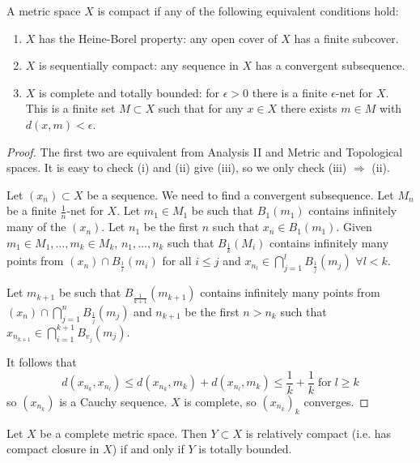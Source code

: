 \documentclass{article}
\begin{document}
\begin{prop}
    A metric space $X$ is compact if any of the following equivalent conditions hold:
    \begin{enumerate}[label=(\roman*)]
        \item $X$ has the Heine-Borel property: any open cover of $X$ has a finite subcover.
        \item $X$ is sequentially compact: any sequence in $X$ has a convergent subsequence.
        \item $X$ is complete and totally bounded: for $\epsilon > 0$ there is a finite $\epsilon$-net for $X$.
            This is a finite set $M \subset X$ such that for any $x \in X$ there exists $m \in M$ with $d(x, m) < \epsilon$.
    \end{enumerate}
\end{prop}


\begin{proof}
    The first two are equivalent from Analysis II and Metric and Topological spaces. It is easy to check (i) and (ii) give (iii), so we only check (iii) $\Rightarrow$ (ii).

    Let $(x_n) \subset X$ be a sequence. We need to find a convergent subsequence. Let $M_n$ be a finite $\frac{1}{n}$-net for $X$.
    Let $m_1 \in M_1$ be such that $B_1(m_1)$ contains infinitely many of the $(x_n)$. Let $n_1$ be the first $n$ such that $x_n \in B_1(m_1)$.
    Given $m_1 \in M_1, \dotsc, m_k \in M_k$, $n_1, \dotsc, n_k$ such that $B_\frac{1}{k}(M_i)$ contains infinitely many points from $(x_n) \cap B_\frac{1}{i}(m_i)$ for all $i \leq j$ and $x_{n_l} \in \bigcap_{j=1}^l B_\frac{1}{j}(m_j)$ $\forall l < k$.

    Let $m_{k+1}$ be such that $B_\frac{1}{k+1}(m_{k+1})$ contains infinitely many points from $(x_n) \cap \bigcap_{j=1}^n B_\frac{1}{j} (m_j)$ and $n_{k+1}$ be the first $n > n_k$ such that $x_{n_{k+1}} \in \bigcap_{i=1}^{k+1} B_{v_j} (m_j)$.

    It follows that
    \begin{equation*}
        d(x_{n_k}, x_{n_l}) \leq d(x_{n_k}, m_k) + d(x_{n_l}, m_k) \leq \frac{1}{k} + \frac{1}{k} \; \text{for} \; l \geq k
    \end{equation*}
    so $(x_{n_k})$ is a Cauchy sequence. $X$ is complete, so $(x_{n_k})_k$ converges.
\end{proof}

\begin{cor}
    Let $X$ be a complete metric space. Then $Y \subset X$ is relatively compact (i.e. has compact closure in $X$) if and only if $Y$ is totally bounded.
\end{cor}
\end{document}
